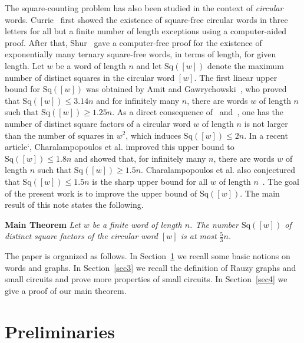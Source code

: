 \documentclass[runningheads,envcountsame,a4paper]{llncs}
\newcommand{\sq}{\mathrm{Sq}}
\begin{document}
The square-counting problem has also been studied in the context of \emph{circular} words. Currie~\cite{Currie02} first showed the existence of square-free circular words in three letters for all but a finite number of length exceptions using a computer-aided proof. After that, Shur~\cite{Shur10} gave a computer-free proof for the existence of exponentially many ternary square-free words, in terms of length, for given length. Let $w$ be a word of length $n$ and let $\sq([w])$ denote the maximum number of distinct squares in the circular word $[w]$. The first linear upper bound for $\sq([w])$ was obtained by Amit and Gawrychowski~\cite{AmitG17}, who proved that $\sq([w]) \leq 3.14n$ and for infinitely many $n$, there are words $w$ of length $n$ such that $\sq([w]) \geq 1.25n$. As a direct consequence of~\cite{sum} and~\cite{power}, one has the number of distinct square factors of a circular word $w$ of length $n$ is not larger than the number of squares in $w^2$, which induces $\sq([w]) \leq 2n$. In a recent article`\cite{CMRRWZ26}, Charalampopoulos et al. improved this upper bound to $\sq([w]) \leq 1.8n$ and showed that, for infinitely many $n$, there are words $w$ of length $n$ such that $\sq([w]) \geq 1.5n$. Charalampopoulos et al. also conjectured that $\sq([w]) \leq 1.5n$ is the sharp upper bound for all $w$ of length $n$~\cite{CMRRWZ26}. The goal of the present work is to improve the upper bound of $\sq([w])$. The main result of this note states the following.

\medskip
\noindent\textbf{Main Theorem}
\emph{Let $w$ be a finite word of length $n$. The number $\sq([w])$ of distinct square factors of the circular word $[w]$ is at most $\frac{5}{3}n$.}
\medskip

The paper is organized as follows. In Section~\ref{sec2} we recall some basic notions on words and graphs. In Section~\ref{sec3} we recall the definition of Rauzy graphs and small circuits and prove more properties of small circuits. In Section~\ref{sec4} we give a proof of our main theorem.

\section{Preliminaries}\label{sec2}
\end{document}
